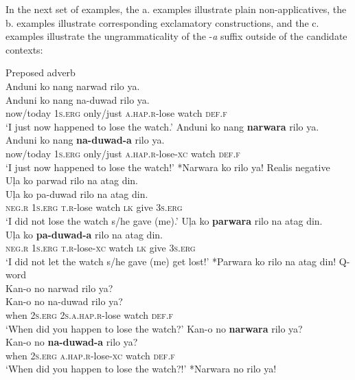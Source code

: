 In the next set of examples, the a. examples illustrate plain non-applicatives, the b. examples illustrate corresponding exclamatory constructions, and the c. examples illustrate the ungrammaticality of the -\textit{a} suffix outside of the candidate contexts:

\newpage
\ea Preposed adverb \\
     \ea 
     Anduni  ko  nang  narwad  rilo  ya. \\\smallskip
\gll Anduni  ko  nang  na-duwad  rilo  ya. \\
        now/today  1\textsc{s.erg}  only/just  \textsc{a.hap.r}-lose  watch  \textsc{def.f} \\
    \glt ‘I just now happened to lose the watch.’
    \ex
    Anduni  ko  nang  \textbf{narwara}  rilo  ya. \\\smallskip
 \gll Anduni  ko  nang  \textbf{na-duwad-a}  rilo  ya. \\
     now/today  1\textsc{s.erg}  only/just  \textsc{a.hap.r}-lose-\textsc{xc}  watch  \textsc{def.f} \\
    \glt ‘I just now happened to lose the watch!’
    \ex
    *Narwara ko rilo ya!
    \z
\z
\ea
Realis negative \\
    \ea
    Uļa  ko  parwad  rilo  na  atag  din. \\\smallskip
 \gll Uļa  ko  pa-duwad  rilo  na  atag  din. \\
    \textsc{neg.r}  1\textsc{s.erg}  \textsc{t.r}-lose  watch \textsc{lk}  give  3\textsc{s.erg} \\
    \glt ‘I did not lose the watch s/he gave (me).’
    \ex
    Uļa  ko  \textbf{parwara}  rilo  na  atag  din. \\\smallskip
 \gll Uļa  ko  \textbf{pa-duwad-a}  rilo  na  atag  din. \\
    \textsc{neg.r}  1\textsc{s.erg}  \textsc{t.r}-lose-\textsc{xc}  watch \textsc{lk}  give  3\textsc{s.erg} \\
    \glt ‘I did not let the watch s/he gave (me) get lost!’
    \ex
    *Parwara ko rilo na atag din!
    \z
\z
\ea Q-word \\
    \ea
    Kan-o  no  narwad  rilo  ya? \\\smallskip
 \gll Kan-o  no  na-duwad  rilo  ya? \\
    when  2\textsc{s.erg}  2\textsc{s.a.hap.r}-lose  watch  \textsc{def.f} \\
    \glt `When did you happen to lose the watch?’
    \ex
    Kan-o  no  \textbf{narwara}  rilo  ya? \\\smallskip
 \gll Kan-o  no  \textbf{na-duwad-a}  rilo  ya? \\
    when  2\textsc{s.erg}  \textsc{a.hap.r}-lose-\textsc{xc}  watch  \textsc{def.f} \\
    \glt ‘When did you happen to lose the watch?!’
    \ex
    *Narwara no rilo ya!
    \z
\z

